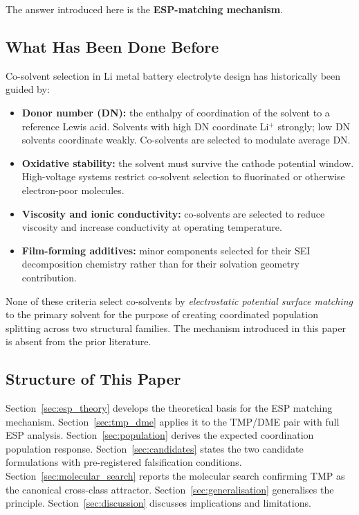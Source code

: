 \documentclass[11pt]{article}
\theoremstyle{plain}
\theoremstyle{definition}
\theoremstyle{remark}
\begin{document}
The answer introduced here is the \textbf{ESP-matching mechanism}.

\subsection{What Has Been Done Before}

Co-solvent selection in Li metal battery electrolyte design has historically
been guided by:

\begin{itemize}[leftmargin=2em]
  \item \textbf{Donor number (DN):} the enthalpy of coordination of the
        solvent to a reference Lewis acid.  Solvents with high DN
        coordinate Li$^+$ strongly; low DN solvents coordinate weakly.
        Co-solvents are selected to modulate average DN.
  \item \textbf{Oxidative stability:} the solvent must survive the cathode
        potential window.  High-voltage systems restrict co-solvent
        selection to fluorinated or otherwise electron-poor molecules.
  \item \textbf{Viscosity and ionic conductivity:} co-solvents are selected
        to reduce viscosity and increase conductivity at operating
        temperature.
  \item \textbf{Film-forming additives:} minor components selected for
        their SEI decomposition chemistry rather than for their solvation
        geometry contribution.
\end{itemize}

None of these criteria select co-solvents by \emph{electrostatic potential
surface matching} to the primary solvent for the purpose of creating
coordinated population splitting across two structural families.  The
mechanism introduced in this paper is absent from the prior literature.

\subsection{Structure of This Paper}

Section~\ref{sec:esp_theory} develops the theoretical basis for the ESP
matching mechanism.  Section~\ref{sec:tmp_dme} applies it to the TMP/DME
pair with full ESP analysis.  Section~\ref{sec:population} derives the
expected coordination population response.  Section~\ref{sec:candidates}
states the two candidate formulations with pre-registered falsification
conditions.  Section~\ref{sec:molecular_search} reports the molecular
search confirming TMP as the canonical cross-class attractor.
Section~\ref{sec:generalisation} generalises the principle.
Section~\ref{sec:discussion} discusses implications and limitations.
\end{document}
